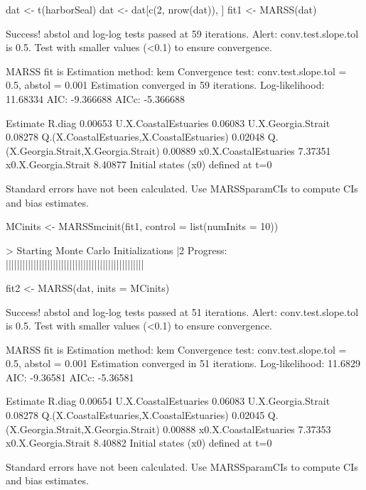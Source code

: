 \begin{Schunk}
\begin{Sinput}
 dat <- t(harborSeal)
 dat <- dat[c(2, nrow(dat)), ]
 fit1 <- MARSS(dat)
\end{Sinput}
\begin{Soutput}
Success! abstol and log-log tests passed at 59 iterations.
Alert: conv.test.slope.tol is 0.5.
Test with smaller values (<0.1) to ensure convergence.

MARSS fit is
Estimation method: kem 
Convergence test: conv.test.slope.tol = 0.5, abstol = 0.001
Estimation converged in 59 iterations. 
Log-likelihood: 11.68334 
AIC: -9.366688   AICc: -5.366688   
 
                                          Estimate
R.diag                                     0.00653
U.X.CoastalEstuaries                       0.06083
U.X.Georgia.Strait                         0.08278
Q.(X.CoastalEstuaries,X.CoastalEstuaries)  0.02048
Q.(X.Georgia.Strait,X.Georgia.Strait)      0.00889
x0.X.CoastalEstuaries                      7.37351
x0.X.Georgia.Strait                        8.40877
Initial states (x0) defined at t=0

Standard errors have not been calculated. 
Use MARSSparamCIs to compute CIs and bias estimates.
\end{Soutput}
\begin{Sinput}
 MCinits <- MARSSmcinit(fit1, control = list(numInits = 10))
\end{Sinput}
\begin{Soutput}
> Starting Monte Carlo Initializations
          |2%      |20%      |40%      |60%      |80%      |100%
Progress: ||||||||||||||||||||||||||||||||||||||||||||||||||
\end{Soutput}
\begin{Sinput}
 fit2 <- MARSS(dat, inits = MCinits)
\end{Sinput}
\begin{Soutput}
Success! abstol and log-log tests passed at 51 iterations.
Alert: conv.test.slope.tol is 0.5.
Test with smaller values (<0.1) to ensure convergence.

MARSS fit is
Estimation method: kem 
Convergence test: conv.test.slope.tol = 0.5, abstol = 0.001
Estimation converged in 51 iterations. 
Log-likelihood: 11.6829 
AIC: -9.36581   AICc: -5.36581   
 
                                          Estimate
R.diag                                     0.00654
U.X.CoastalEstuaries                       0.06083
U.X.Georgia.Strait                         0.08278
Q.(X.CoastalEstuaries,X.CoastalEstuaries)  0.02045
Q.(X.Georgia.Strait,X.Georgia.Strait)      0.00888
x0.X.CoastalEstuaries                      7.37353
x0.X.Georgia.Strait                        8.40882
Initial states (x0) defined at t=0

Standard errors have not been calculated. 
Use MARSSparamCIs to compute CIs and bias estimates.
\end{Soutput}
\end{Schunk}

